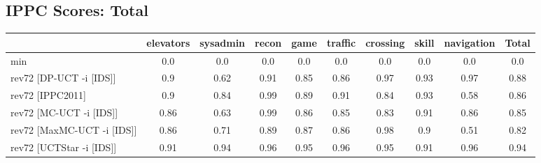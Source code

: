 \documentclass{article}
\begin{document}
\bigskip

\subsection*{IPPC Scores: Total}

\begin{tabular}{|l|r@{$\pm$}rr@{$\pm$}rr@{$\pm$}rr@{$\pm$}rr@{$\pm$}rr@{$\pm$}rr@{$\pm$}rr@{$\pm$}rr@{$\pm$}r|}
\hline

& \multicolumn{2}{c}{elevators}
& \multicolumn{2}{c}{sysadmin}
& \multicolumn{2}{c}{recon}
& \multicolumn{2}{c}{game}
& \multicolumn{2}{c}{traffic}
& \multicolumn{2}{c}{crossing}
& \multicolumn{2}{c}{skill}
& \multicolumn{2}{c}{navigation}
& \multicolumn{2}{c|}{Total}
\\
\hline
\hline
min
& \multicolumn{2}{c}{0.0}
& \multicolumn{2}{c}{0.0}
& \multicolumn{2}{c}{0.0}
& \multicolumn{2}{c}{0.0}
& \multicolumn{2}{c}{0.0}
& \multicolumn{2}{c}{0.0}
& \multicolumn{2}{c}{0.0}
& \multicolumn{2}{c}{0.0}
& \multicolumn{2}{c|}{0.0}
\\
rev72 [DP-UCT -i [IDS]]
& \multicolumn{2}{c}{0.9}
& \multicolumn{2}{c}{0.62}
& \multicolumn{2}{c}{0.91}
& \multicolumn{2}{c}{0.85}
& \multicolumn{2}{c}{0.86}
& \multicolumn{2}{c}{0.97}
& \multicolumn{2}{c}{0.93}
& \multicolumn{2}{c}{0.97}
& \multicolumn{2}{c|}{0.88}
\\
rev72 [IPPC2011]
& \multicolumn{2}{c}{0.9}
& \multicolumn{2}{c}{0.84}
& \multicolumn{2}{c}{0.99}
& \multicolumn{2}{c}{0.89}
& \multicolumn{2}{c}{0.91}
& \multicolumn{2}{c}{0.84}
& \multicolumn{2}{c}{0.93}
& \multicolumn{2}{c}{0.58}
& \multicolumn{2}{c|}{0.86}
\\
rev72 [MC-UCT -i [IDS]]
& \multicolumn{2}{c}{0.86}
& \multicolumn{2}{c}{0.63}
& \multicolumn{2}{c}{0.99}
& \multicolumn{2}{c}{0.86}
& \multicolumn{2}{c}{0.85}
& \multicolumn{2}{c}{0.83}
& \multicolumn{2}{c}{0.91}
& \multicolumn{2}{c}{0.86}
& \multicolumn{2}{c|}{0.85}
\\
rev72 [MaxMC-UCT -i [IDS]]
& \multicolumn{2}{c}{0.86}
& \multicolumn{2}{c}{0.71}
& \multicolumn{2}{c}{0.89}
& \multicolumn{2}{c}{0.87}
& \multicolumn{2}{c}{0.86}
& \multicolumn{2}{c}{0.98}
& \multicolumn{2}{c}{0.9}
& \multicolumn{2}{c}{0.51}
& \multicolumn{2}{c|}{0.82}
\\
rev72 [UCTStar -i [IDS]]
& \multicolumn{2}{c}{0.91}
& \multicolumn{2}{c}{0.94}
& \multicolumn{2}{c}{0.96}
& \multicolumn{2}{c}{0.95}
& \multicolumn{2}{c}{0.96}
& \multicolumn{2}{c}{0.95}
& \multicolumn{2}{c}{0.91}
& \multicolumn{2}{c}{0.96}
& \multicolumn{2}{c|}{0.94}
\\

\end{tabular}
\end{document}
